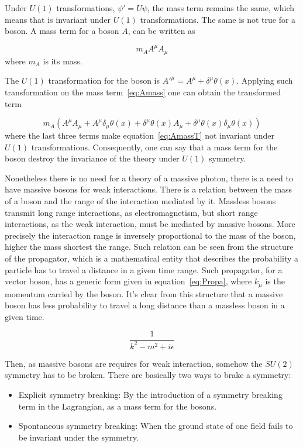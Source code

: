 Under $U(1)$ transformations, $\psi'=U \psi$, the mass term remains the same, which means that is invariant under $U(1)$ transformations. The same is not true for a boson. A mass term for a boson $A$, can be written as 

\begin{equation}
  \label{eq:Amass}
  m_{A}A^{\mu}A_{\mu}
\end{equation} where $m_{A}$ is its mass.

The $U(1)$ transformation for the boson is $A'^{\mu}=A^{\mu}+\delta^{\mu}\theta(x)$. Applying such transformation on the mass term~\ref{eq:Amass} one can obtain the transformed term

\begin{equation}
  \label{eq:AmassT}
  m_{A}\left(A^{\mu}A_{\mu}+A^{\mu}\delta_{\mu}\theta(x)+\delta^{\mu}\theta(x)A_{\mu}+\delta^{\mu}\theta(x)\delta_{\mu}\theta(x)\right)
\end{equation}where the last three terms make equation~\ref{eq:AmassT} not invariant under $U(1)$ transformations. Consequently, one can say that a mass term for the boson destroy the invariance of the theory under $U(1)$ symmetry.

Nonetheless there is no need for a theory of a massive photon, there is a need to have massive bosons for weak interactions. There is a relation between the mass of a boson and the range of the interaction mediated by it. Massless bosons transmit long range interactions, as electromagnetism, but short range interactions, as the weak interaction, must be mediated by massive bosons. More precisely the interaction range is inversely proportional to the mass of the boson, higher the mass shortest the range. Such relation can be seen from the structure of the propagator, which is a mathematical entity that describes the probability a particle has to travel a distance in a given time range. Such propagator, for a vector boson, has a generic form given in equation~\ref{eq:Propa}, where $k_{\mu}$ is the momentum carried by the boson. It's clear from this structure that a massive boson has less probability to travel a long distance than a massless boson in a given time.

\begin{equation}
  \label{eq:Propa}
  \frac{1}{k^{2}-m^{2}+i\epsilon}
\end{equation}

Then, as massive bosons are requires for weak interaction, somehow the $SU(2)$ symmetry has to be broken. There are basically two ways to brake a symmetry: 
\begin{itemize}
\item Explicit symmetry breaking: By the introduction of a symmetry breaking term in the Lagrangian, as a mass term for the bosons.
\item Spontaneous symmetry breaking: When the ground state of one field fails to be invariant under the symmetry. 
\end{itemize}

